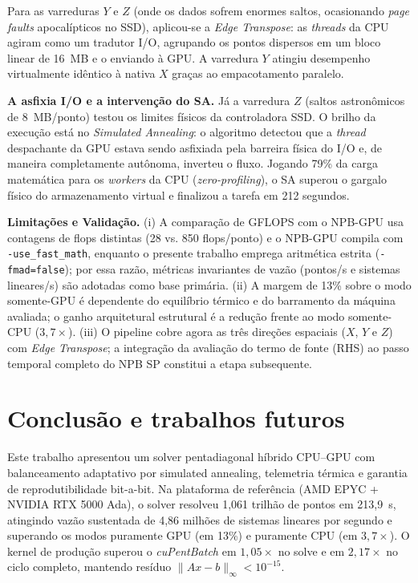 \documentclass[12pt]{article}
\begin{document}
Para as varreduras $Y$ e $Z$ (onde os dados sofrem enormes saltos, ocasionando \textit{page faults} apocalípticos no SSD), aplicou-se a \textit{Edge Transpose}: as \textit{threads} da CPU agiram como um tradutor I/O, agrupando os pontos dispersos em um bloco linear de 16~MB e o enviando à GPU. A varredura $Y$ atingiu desempenho virtualmente idêntico à nativa $X$ graças ao empacotamento paralelo.

\noindent\textbf{A asfixia I/O e a intervenção do SA.}
Já a varredura $Z$ (saltos astronômicos de 8~MB/ponto) testou os limites físicos da controladora SSD. O brilho da execução está no \textit{Simulated Annealing}: o algoritmo detectou que a \textit{thread} despachante da GPU estava sendo asfixiada pela barreira física do I/O e, de maneira completamente autônoma, inverteu o fluxo. Jogando 79\% da carga matemática para os \textit{workers} da CPU (\textit{zero-profiling}), o SA superou o gargalo físico do armazenamento virtual e finalizou a tarefa em 212 segundos.

\noindent\textbf{Limitações e Validação.}
(i) A comparação de GFLOPS com o NPB-GPU usa contagens de flops distintas (28 vs. 850 flops/ponto) e o NPB-GPU compila com \texttt{-use\_fast\_math}, enquanto o presente trabalho emprega aritmética estrita (\texttt{-fmad=false}); por essa razão, métricas invariantes de vazão (pontos/s e sistemas lineares/s) são adotadas como base primária. (ii) A margem de 13\% sobre o modo somente-GPU é dependente do equilíbrio térmico e do barramento da máquina avaliada; o ganho arquitetural estrutural é a redução frente ao modo somente-CPU ($3{,}7\times$). (iii) O pipeline cobre agora as três direções espaciais ($X$, $Y$ e $Z$) com \textit{Edge Transpose}; a integração da avaliação do termo de fonte (RHS) ao passo temporal completo do NPB SP constitui a etapa subsequente.

\section{Conclusão e trabalhos futuros}\label{sec:conc}

Este trabalho apresentou um solver pentadiagonal híbrido CPU--GPU com balanceamento adaptativo por simulated annealing, telemetria térmica e garantia de reprodutibilidade bit-a-bit. Na plataforma de referência (AMD EPYC + NVIDIA RTX 5000 Ada), o solver resolveu 1,061 trilhão de pontos em 213,9~s, atingindo vazão sustentada de 4,86 milhões de sistemas lineares por segundo e superando os modos puramente GPU (em 13\%) e puramente CPU (em $3{,}7\times$). O kernel de produção superou o \textit{cuPentBatch} em $1{,}05\times$ no solve e em $2{,}17\times$ no ciclo completo, mantendo resíduo $\|Ax-b\|_\infty < 10^{-15}$.
\end{document}
